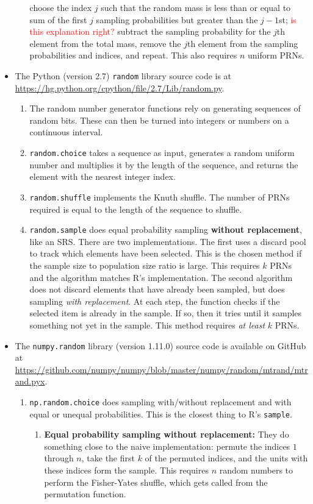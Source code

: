 \documentclass[12pt]{article}
\begin{document}
\begin{itemize}
\begin{enumerate}
choose the index $j$ such that the random mass is less than or equal to sum of the first $j$ sampling probabilities but greater than the $j-1$st; \textcolor{red}{is this explanation right?}
subtract the sampling probability for the $j$th element from the total mass, remove the $j$th element from the sampling probabilities and indices, and repeat.
This also requires $n$ uniform PRNs.
\end{enumerate}
\item The Python (version 2.7) \texttt{random} library source code is at \url{https://hg.python.org/cpython/file/2.7/Lib/random.py}.
\begin{enumerate}
\item The random number generator functions rely on generating sequences of random bits.
These can then be turned into integers or numbers on a continuous interval.
\item \texttt{random.choice} takes a sequence as input, generates a random uniform number and multiplies it by the length of the sequence, and returns the element with the nearest integer index.
\item \texttt{random.shuffle} implements the Knuth shuffle. 
The number of PRNs required is equal to the length of the sequence to shuffle.
\item \texttt{random.sample} does equal probability sampling \textbf{without replacement}, like an SRS.
There are two implementations.
The first uses a discard pool to track which elements have been selected.
This is the chosen method if the sample size to population size ratio is large.
This requires $k$ PRNs and the algorithm matches R's implementation.
The second algorithm does not discard elements that have already been sampled, but does sampling \textit{with replacement}.
At each step, the function checks if the selected item is already in the sample.
If so, then it tries until it samples something not yet in the sample.
This method requires \textit{at least} $k$ PRNs.
\end{enumerate}
\item The \texttt{numpy.random} library (version 1.11.0) source code is available on GitHub at \url{https://github.com/numpy/numpy/blob/master/numpy/random/mtrand/mtrand.pyx}.
\begin{enumerate}
\item \texttt{np.random.choice} does sampling with/without replacement and with equal or unequal probabilities.
This is the closest thing to R's \texttt{sample}.
\begin{enumerate}

\item \textbf{Equal probability sampling without replacement:} 
They do something close to the naive implementation:
permute the indices $1$ through $n$,
take the first $k$ of the permuted indices,
and the units with these indices form the sample.
This requires $n$ random numbers to perform the Fisher-Yates shuffle, which gets called from the permutation function.
\end{enumerate}
\end{enumerate}

\end{itemize}
\end{document}
